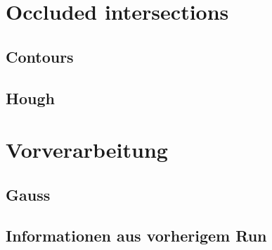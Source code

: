 	\section{Occluded intersections}
	\subsection{Contours}
	\subsection{Hough}

	\section{Vorverarbeitung}
	\subsection{Gauss}
	\subsection{Informationen aus vorherigem Run}
